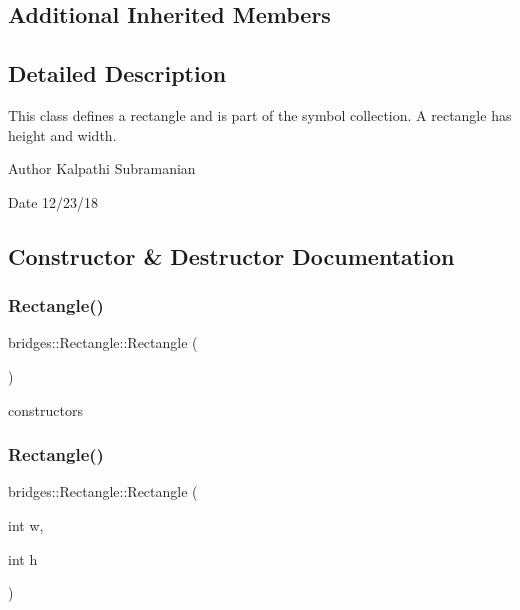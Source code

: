 \subsection*{Additional Inherited Members}


\subsection{Detailed Description}
This class defines a rectangle and is part of the symbol collection. A rectangle has height and width. 

\begin{DoxyAuthor}{Author}
Kalpathi Subramanian 
\end{DoxyAuthor}
\begin{DoxyDate}{Date}
12/23/18 
\end{DoxyDate}


\subsection{Constructor \& Destructor Documentation}
\mbox{\label{classbridges_1_1_rectangle_a8d5b640b27372d32d7761769df343290}} 
\subsubsection{\texorpdfstring{Rectangle()}{Rectangle()}\hspace{0.1cm}{\footnotesize\ttfamily [1/3]}}
{\footnotesize\ttfamily bridges\+::\+Rectangle\+::\+Rectangle (\begin{DoxyParamCaption}{ }\end{DoxyParamCaption})\hspace{0.3cm}{\ttfamily [inline]}}

constructors \mbox{\label{classbridges_1_1_rectangle_ab5b67756e761bdd9515406874fbfb75a}} 
\subsubsection{\texorpdfstring{Rectangle()}{Rectangle()}\hspace{0.1cm}{\footnotesize\ttfamily [2/3]}}
{\footnotesize\ttfamily bridges\+::\+Rectangle\+::\+Rectangle (\begin{DoxyParamCaption}\item[{int}]{w,  }\item[{int}]{h }\end{DoxyParamCaption})\hspace{0.3cm}{\ttfamily [inline]}}

